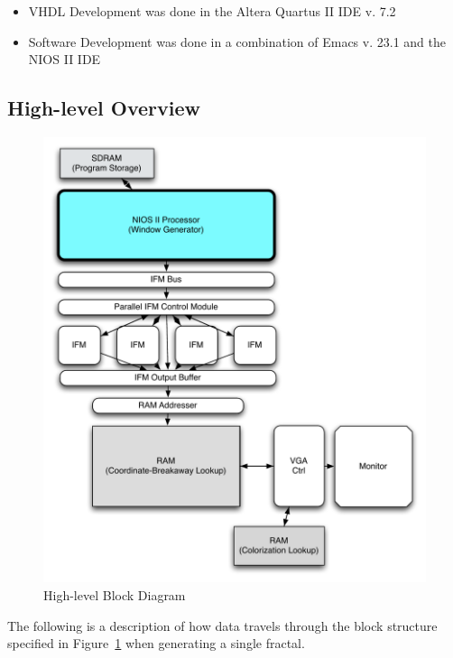 \documentclass{article}
\begin{document}
\begin{itemize}
\item VHDL Development was done in the Altera Quartus II IDE v. 7.2
\item Software Development was done in a combination of Emacs v. 23.1 and the NIOS II IDE
\end{itemize}

\subsection{High-level Overview}


\begin{figure}\label{fig:block}
  \centering
	\includegraphics[width=\textwidth]{block_diagrams/top_level.pdf}
  \caption{High-level Block Diagram}
\end{figure}

The following is a description of how data travels through the block structure specified in Figure~\ref{fig:block} when generating a single fractal.
\end{document}
